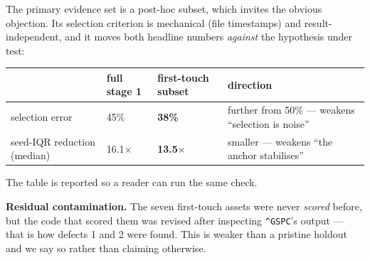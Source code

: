The primary evidence set is a post-hoc subset, which invites the obvious objection. Its
selection criterion is mechanical (file timestamps) and result-independent, and it moves both
headline numbers \emph{against} the hypothesis under test:

\begin{longtable}[]{@{}llll@{}}
\toprule
\begin{minipage}[b]{0.22\columnwidth}\raggedright
\strut
\end{minipage} & \begin{minipage}[b]{0.22\columnwidth}\raggedright
full stage 1\strut
\end{minipage} & \begin{minipage}[b]{0.22\columnwidth}\raggedright
first-touch subset\strut
\end{minipage} & \begin{minipage}[b]{0.22\columnwidth}\raggedright
direction\strut
\end{minipage}\tabularnewline
\midrule
\endhead
\begin{minipage}[t]{0.22\columnwidth}\raggedright
selection error\strut
\end{minipage} & \begin{minipage}[t]{0.22\columnwidth}\raggedright
45\%\strut
\end{minipage} & \begin{minipage}[t]{0.22\columnwidth}\raggedright
\textbf{38\%}\strut
\end{minipage} & \begin{minipage}[t]{0.22\columnwidth}\raggedright
further from 50\% --- weakens ``selection is noise''\strut
\end{minipage}\tabularnewline
\begin{minipage}[t]{0.22\columnwidth}\raggedright
seed-IQR reduction (median)\strut
\end{minipage} & \begin{minipage}[t]{0.22\columnwidth}\raggedright
16.1$\times$\strut
\end{minipage} & \begin{minipage}[t]{0.22\columnwidth}\raggedright
\textbf{13.5$\times$}\strut
\end{minipage} & \begin{minipage}[t]{0.22\columnwidth}\raggedright
smaller --- weakens ``the anchor stabilises''\strut
\end{minipage}\tabularnewline
\bottomrule
\end{longtable}

The table is reported so a reader can run the same check.

\textbf{Residual contamination.} The seven first-touch assets were never \emph{scored} before, but the
code that scored them was revised after inspecting \texttt{\^{}GSPC}'s output --- that is how defects 1 and
2 were found. This is weaker than a pristine holdout and we say so rather than claiming
otherwise.
